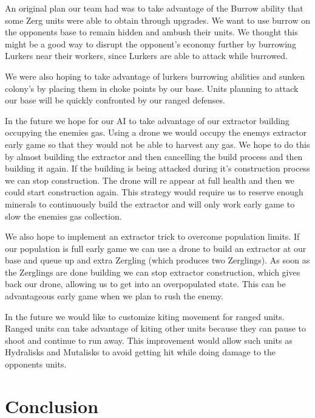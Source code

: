 \documentclass{article}
\begin{document}
An original plan our team had was to take advantage of the Burrow ability that some Zerg units were able to obtain through upgrades. We want to use burrow on the opponents base to remain hidden and ambush their units. We thought this might be a good way to disrupt the opponent's economy further by burrowing Lurkers near their workers, since Lurkers are able to attack while burrowed.

We were also hoping to take advantage of lurkers burrowing abilities and sunken colony’s by placing them in choke points by our base. Units planning to attack our base will be quickly confronted by our ranged defenses.

In the future we hope for our AI to take advantage of our extractor building occupying the enemies gas. Using a drone we would occupy the enemys extractor early game so that they would not be able to harvest any gas. We hope to do this by almost building the extractor and then cancelling the build process and then building it again. If the building is being attacked during it’s construction process we can stop construction. The drone will re appear at full health and then we could start construction again. This strategy would require us to reserve enough minerals to continuously build the extractor and will only work early game to slow the enemies gas collection. 

We also hope to implement an extractor trick to overcome population limits. If our population is full early game we can use a drone to build an extractor at our base and queue up and extra Zergling (which produces two Zerglings). As soon as the Zerglings are done building we can stop extractor construction, which gives back our drone, allowing us to get into an overpopulated state. This can be advantageous early game when we plan to rush the enemy.

In the future we would like to customize kiting movement for ranged units. Ranged units can take advantage of kiting other units because they can pause to shoot and continue to run away. This improvement would allow such units as Hydralisks and Mutalisks to avoid getting hit while doing damage to the opponents units. 

\section{Conclusion}
\end{document}
